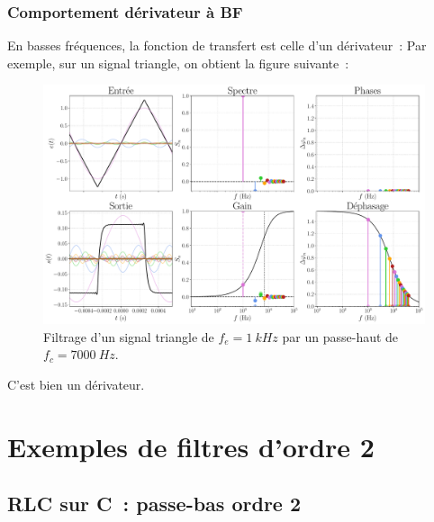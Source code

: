 \documentclass[../../main/main.tex]{subfiles}
\begin{document}
\subsubsection{Comportement dérivateur à BF}
En basses fréquences, la fonction de transfert est celle d'un dérivateur~:
Par exemple, sur un signal triangle, on obtient la figure suivante~:
\begin{figure}[htbp]
	\centering
	\includegraphics[width=.95\linewidth]{fft_trgl_bth_PH-fe=1000-fc=7000}
	\caption{Filtrage d'un signal triangle de $f_e = \SI{1}{kHz}$ par un
		passe-haut de $f_c = \SI{7000}{Hz}$.}
	\label{fig:trglPH}
\end{figure}
C'est bien un dérivateur.

\section{Exemples de filtres d'ordre 2}
\subsection{RLC sur C~: passe-bas ordre 2}
\end{document}
